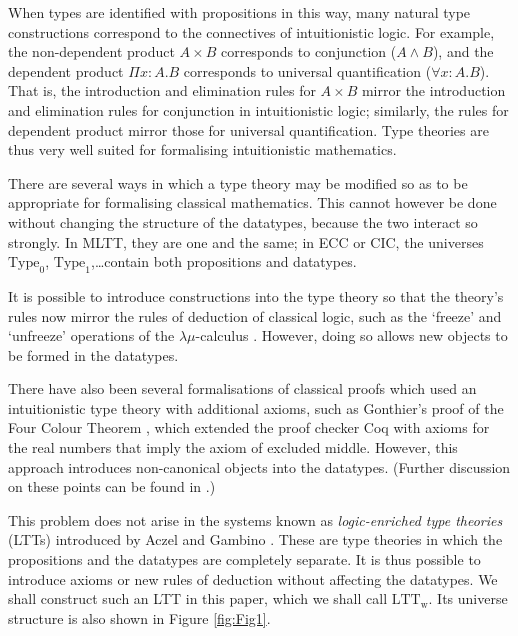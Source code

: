 \documentclass[acmtocl]{acmtrans2m}
\newcommand{\LTTW}{\ensuremath{\mathrm{LTT}_\mathrm{w}}}
\begin{document}
When types are identified with propositions in this way, many natural type constructions correspond to the connectives of intuitionistic logic.  For example, the non-dependent product $A \times B$ corresponds to conjunction ($A \wedge B$), and the dependent product $\Pi x:A.B$ corresponds to universal quantification ($\forall x:A.B$).  That is, the introduction and elimination rules for $A \times B$ mirror the introduction and elimination rules for conjunction in intuitionistic logic; similarly, the rules for dependent product mirror those for universal quantification.
Type theories are thus very well suited for formalising intuitionistic mathematics.

There are several ways in which a type theory may be modified so as to be appropriate for formalising classical mathematics. This cannot however be done without changing the structure of the datatypes, because the two interact so strongly.  In MLTT, they are one and the same; in ECC or CIC, the universes $\mathrm{Type}_0$, $\mathrm{Type}_1$,\nolinebreak \ldots contain both propositions and datatypes.

It is possible to introduce constructions
into the type theory so that the theory's rules now mirror the rules of deduction of classical logic, such as the `freeze' and `unfreeze' operations of the $\lambda \mu$-calculus \cite{lambdamu}.  However, doing so allows new objects to be formed in the datatypes.

There have also been several formalisations of classical proofs which used an intuitionistic type theory with additional axioms,
such as Gonthier's proof of the Four Colour Theorem
\cite{gonthier:fct}, which extended the proof checker Coq with axioms for the real numbers that imply the axiom of excluded middle.  However, this approach introduces non-canonical objects into the datatypes.
(Further discussion on these points can be found in \cite{luo:LTT06}.)





This problem does not arise in the systems known as \emph{logic-enriched type theories} (LTTs) introduced by Aczel and Gambino \cite{ag:cpdtt,ga:gticst}.  These are type theories in which the propositions and the datatypes are completely separate.  It is thus possible to introduce axioms or new rules of deduction without affecting the datatypes.  We shall construct such an LTT in this paper, which we shall call \LTTW.  Its universe structure is also shown in Figure \ref{fig:Fig1}.
\end{document}
